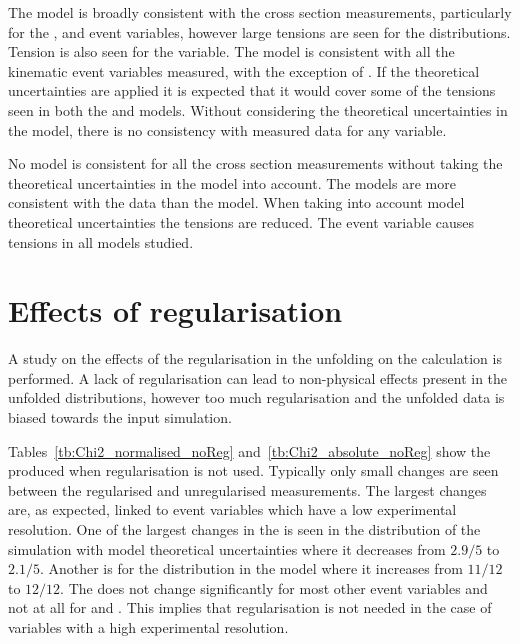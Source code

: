 The \powhegherwig{} model is broadly consistent with the cross section measurements, particularly for the \ptmiss{}, \LPT{} and \WPT{} event variables, however large tensions are seen for the \NJET{} distributions.
Tension is also seen for the \LETA{} variable.
The \mgamcFxFxpythia{} model is consistent with all the kinematic event variables measured, with the exception of \LETA{}.
If the theoretical uncertainties are applied it is expected that it would cover some of the tensions seen in both the \powhegherwig{} and \mgamcFxFxpythia{} models.
Without considering the theoretical uncertainties in the \mgamcMLMpythia{} model, there is no consistency with measured data for any variable. 

No model is consistent for all the cross section measurements without taking the theoretical uncertainties in the model into account.
The \NLO{} models are more consistent with the data than the \LO{} model.
When taking into account model theoretical uncertainties the tensions are reduced.
The \LETA{} event variable causes tensions in all models studied.


\section{Effects of regularisation} %
\label{sec:effects_of_regularisation}

A study on the effects of the regularisation in the unfolding on the \chisndf{} calculation is performed.
A lack of regularisation can lead to non-physical effects present in the unfolded distributions, however too much regularisation and the unfolded data is biased towards the input simulation.

Tables~\ref{tb:Chi2_normalised_noReg} and~\ref{tb:Chi2_absolute_noReg} show the \chisndf{} produced when regularisation is not used.
Typically only small changes are seen between the regularised and unregularised measurements.
The largest changes are, as expected, linked to event variables which have a low experimental resolution.
One of the largest changes in the \chisndf{} is seen in the \ptmiss{} distribution of the \powhegpythia{} simulation with model theoretical uncertainties where it decreases from $2.9/5$ to $2.1/5$.
Another is for the \HT{} distribution in the \mgamcFxFxpythia{} model where it increases from $11/12$ to $12/12$.
The \chisndf{} does not change significantly for most other event variables and not at all for \LPT{} and \LETA{}.
This implies that regularisation is not needed in the case of variables with a high experimental resolution. 








